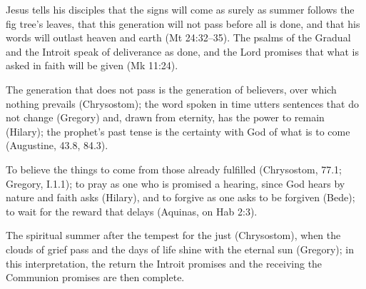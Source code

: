 \begin{fourSenses}
\item[Literal.] Jesus tells his disciples that the signs will come as surely as
summer follows the fig tree's leaves, that this generation will not pass
before all is done, and that his words will outlast heaven and earth (Mt
24:32--35). The psalms of the Gradual and the Introit speak of deliverance as
done, and the Lord promises that what is asked in faith will be given (Mk
11:24).
\item[Allegorical.] The generation that does not pass is the generation of
believers, over which nothing prevails (Chrysostom); the word spoken in time
utters sentences that do not change (Gregory) and, drawn from eternity, has
the power to remain (Hilary); the prophet's past tense is the certainty with
God of what is to come (Augustine, 43.8, 84.3).
\item[Moral.] To believe the things to come from those already fulfilled
(Chrysostom, 77.1; Gregory, I.1.1); to pray as one who is promised a hearing,
since God hears by nature and faith asks (Hilary), and to forgive as one asks
to be forgiven (Bede); to wait for the reward that delays (Aquinas, on Hab
2:3).
\item[Anagogical.] The spiritual summer after the tempest for the just
(Chrysostom), when the clouds of grief pass and the days of life shine with
the eternal sun (Gregory); in this interpretation, the return the Introit
promises and the receiving the Communion promises are then complete.
\end{fourSenses}
